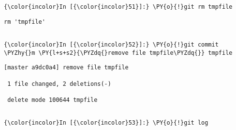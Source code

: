     \begin{Verbatim}[commandchars=\\\{\}]
{\color{incolor}In [{\color{incolor}51}]:} \PY{o}{!}git rm tmpfile
\end{Verbatim}

    \begin{Verbatim}[commandchars=\\\{\}]
rm 'tmpfile'


    \end{Verbatim}

    \begin{Verbatim}[commandchars=\\\{\}]
{\color{incolor}In [{\color{incolor}52}]:} \PY{o}{!}git commit \PYZhy{}m \PY{l+s+s2}{\PYZdq{}remove file tmpfile\PYZdq{}} tmpfile 
\end{Verbatim}

    \begin{Verbatim}[commandchars=\\\{\}]
[master a9dc0a4] remove file tmpfile

 1 file changed, 2 deletions(-)

 delete mode 100644 tmpfile


    \end{Verbatim}





    \begin{Verbatim}[commandchars=\\\{\}]
{\color{incolor}In [{\color{incolor}53}]:} \PY{o}{!}git log
\end{Verbatim}

